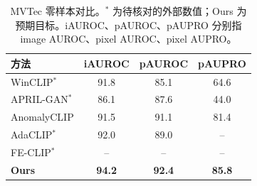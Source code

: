 \begin{table}[t]
\centering
\caption{MVTec 零样本对比。$^{*}$ 为待核对的外部数值；Ours 为预期目标。iAUROC、pAUROC、pAUPRO 分别指 image AUROC、pixel AUROC、pixel AUPRO。}
\label{tab:sota}
\small
\setlength{\tabcolsep}{4.5pt}
\begin{tabular}{lccc}
\toprule
方法 & iAUROC & pAUROC & pAUPRO \\
\midrule
WinCLIP$^{*}$    & 91.8 & 85.1 & 64.6 \\
APRIL-GAN$^{*}$  & 86.1 & 87.6 & 44.0 \\
AnomalyCLIP      & 91.5 & 91.1 & 81.4 \\
AdaCLIP$^{*}$    & 92.0 & 89.0 & --   \\
FE-CLIP$^{*}$    & --   & --   & --   \\
\midrule
\textbf{Ours}    & \textbf{94.2} & \textbf{92.4} & \textbf{85.8} \\
\bottomrule
\end{tabular}
\end{table}
